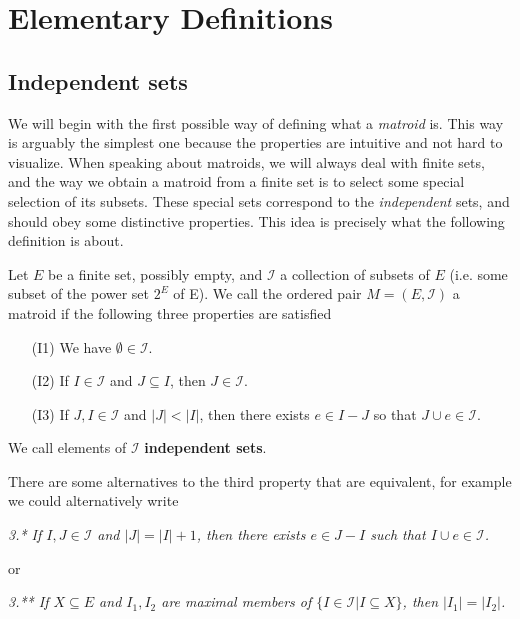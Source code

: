 
\section{Elementary Definitions}

\subsection{Independent sets}

We will begin with the first possible way of defining what a \textit{matroid} is. This way is arguably the simplest one because the properties are intuitive and not hard to visualize. When speaking about matroids, we will always deal with finite sets, and the way we obtain a matroid from a finite set is to select some special selection of its subsets.  These special sets correspond to the \textit{independent} sets, and should obey some distinctive properties. This idea is precisely what the following definition is about.

\begin{defn}
    Let $E$ be a finite set, possibly empty, and $\mathcal{I}$ a collection of subsets of $E$ (i.e. some subset of the power set $2^E$ of E). We call the ordered pair $M = (E, \mathcal{I})$ a matroid if the following three properties are satisfied

    \begin{enumerate}
        \item[(I1)] We have $\emptyset \in \mathcal{I}$.
        
        \item[(I2)] If $I \in \mathcal{I}$ and $J \subseteq I$, then $J \in \mathcal{I}$.
        
        \item[(I3)] If $J, I \in \mathcal{I}$ and $|J| < |I|$, then there exists $e \in I - J$ so that $J \cup e \in \mathcal{I}$.
    \end{enumerate}

    We call elements of $\mathcal{I}$ \textbf{independent sets}. 
\end{defn}

There are some alternatives to the third property that are equivalent, for example we could alternatively write

\textit{3.* If $I, J \in \mathcal{I} $ and $|J| = |I| + 1$, then there exists $e \in J - I$ such that $I \cup e \in \mathcal{I}$.}

or

\textit{3.** If $X \subseteq E$ and $I_1, I_2$ are maximal members of $\{ I \in \mathcal{I} | I \subseteq X \}$, then $|I_1| = |I_2|$.}

